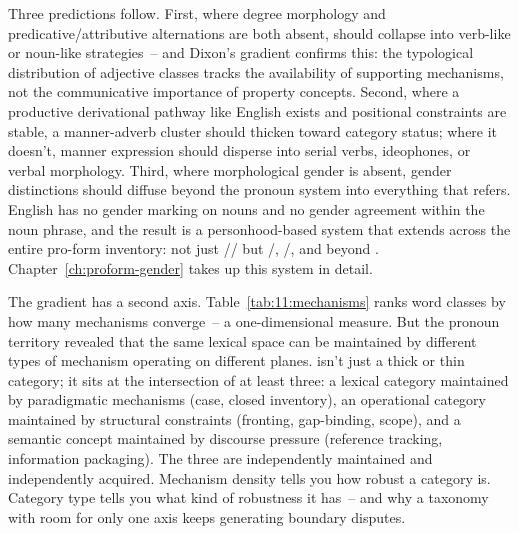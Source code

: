 Three predictions follow. First, where degree morphology and predicative/attributive alternations are both absent,  should collapse into verb-like or noun-like strategies~-- and Dixon's gradient confirms this: the typological distribution of adjective classes tracks the availability of supporting mechanisms, not the communicative importance of property concepts. Second, where a productive derivational pathway like English  exists and positional constraints are stable, a manner-adverb cluster should thicken toward category status; where it doesn't, manner expression should disperse into serial verbs, ideophones, or verbal morphology. Third, where morphological gender is absent, gender distinctions should diffuse beyond the pronoun system into everything that refers. English has no gender marking on nouns and no gender agreement within the noun phrase, and the result is a personhood-based system that extends across the entire pro-form inventory: not just // but /, /, and beyond \citep[cf.][]{corbett1991, audring2009}. Chapter~\ref{ch:proform-gender} takes up this system in detail.

The gradient has a second axis. Table~\ref{tab:11:mechanisms} ranks word classes by how many mechanisms converge~-- a one-dimensional measure. But the pronoun territory revealed that the same lexical space can be maintained by different types of mechanism operating on different planes.  isn't just a thick or thin category; it sits at the intersection of at least three: a lexical category maintained by paradigmatic mechanisms (case, closed inventory), an operational category maintained by structural constraints (fronting, gap-binding, scope), and a semantic concept maintained by discourse pressure (reference tracking, information packaging). The three are independently maintained and independently acquired. Mechanism density tells you how robust a category is. Category type tells you what kind of robustness it has~-- and why a taxonomy with room for only one axis keeps generating boundary disputes.

